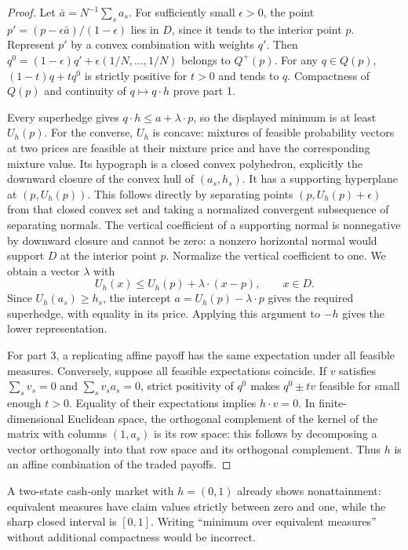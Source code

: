 \documentclass[11pt,a4paper]{article}
\theoremstyle{remark}
\begin{document}
\begin{proof}
Let $\bar a=N^{-1}\sum_s a_s$. For sufficiently small $\epsilon>0$, the point $p'=(p-\epsilon\bar a)/(1-\epsilon)$ lies in $D$, since it tends to the interior point $p$. Represent $p'$ by a convex combination with weights $q'$. Then $q^0=(1-\epsilon)q'+\epsilon(1/N,\ldots,1/N)$ belongs to $Q^+(p)$. For any $q\in Q(p)$, $(1-t)q+tq^0$ is strictly positive for $t>0$ and tends to $q$. Compactness of $Q(p)$ and continuity of $q\mapsto q\cdot h$ prove part 1.

Every superhedge gives $q\cdot h\le a+\lambda\cdot p$, so the displayed minimum is at least $U_h(p)$. For the converse, $U_h$ is concave: mixtures of feasible probability vectors at two prices are feasible at their mixture price and have the corresponding mixture value. Its hypograph is a closed convex polyhedron, explicitly the downward closure of the convex hull of $(a_s,h_s)$. It has a supporting hyperplane at $(p,U_h(p))$. This follows directly by separating points $(p,U_h(p)+\epsilon)$ from that closed convex set and taking a normalized convergent subsequence of separating normals. The vertical coefficient of a supporting normal is nonnegative by downward closure and cannot be zero: a nonzero horizontal normal would support $D$ at the interior point $p$. Normalize the vertical coefficient to one. We obtain a vector $\lambda$ with
\[
 U_h(x)\le U_h(p)+\lambda\cdot(x-p),\qquad x\in D.
\]
Since $U_h(a_s)\ge h_s$, the intercept $a=U_h(p)-\lambda\cdot p$ gives the required superhedge, with equality in its price. Applying this argument to $-h$ gives the lower representation.

For part 3, a replicating affine payoff has the same expectation under all feasible measures. Conversely, suppose all feasible expectations coincide. If $v$ satisfies $\sum_s v_s=0$ and $\sum_s v_sa_s=0$, strict positivity of $q^0$ makes $q^0\pm tv$ feasible for small enough $t>0$. Equality of their expectations implies $h\cdot v=0$. In finite-dimensional Euclidean space, the orthogonal complement of the kernel of the matrix with columns $(1,a_s)$ is its row space: this follows by decomposing a vector orthogonally into that row space and its orthogonal complement. Thus $h$ is an affine combination of the traded payoffs.
\end{proof}

A two-state cash-only market with $h=(0,1)$ already shows nonattainment: equivalent measures have claim values strictly between zero and one, while the sharp closed interval is $[0,1]$. Writing ``minimum over equivalent measures'' without additional compactness would be incorrect.
\end{document}
